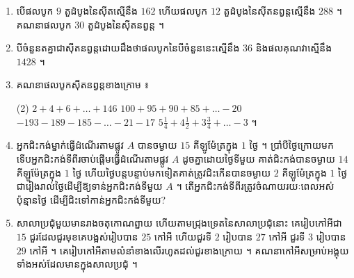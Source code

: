 \begin{enumerate}[1]
  \item បើផលបូក $9$ តួដំបូងនៃស៊ីតស្មើនឹង $162$ ហើយផលបូក $12$ តួដំបូងនៃស៊ីតនព្វន្តស្មើនឹង $288$ ។ គណនាផលបូក $30$ តួដំបូងនៃស៊ីតនព្វន្ត ។
  \item បីចំនួនតគ្នាជាស៊ីតនព្វន្តដោយដឹងថាផលបូកនៃបីចំនួននេះស្មើនឹង $36$ និងផលគុណវាស្មើនឹង $1428$ ។
  \item គណនាផលបូកស៊ីតនព្វន្តខាងក្រោម ៖
  \begin{tasks}(2)
    \task $2 + 4 + 6 + \ldots + 146$
    \task $100 + 95 + 90 + 85 + \ldots - 20$
    \task $-193 - 189 - 185 - \ldots - 21 - 17$
    \task $5\frac{1}{4} + 4\frac{1}{2} + 3\frac{3}{4} + \ldots - 3$ ។
  \end{tasks}
  \item អ្នកជិះកង់ម្នាក់ធ្វើដំណើរតាមផ្លូវ $A$ បានចម្ងាយ $15$ គីឡូម៉ែត្រក្នុង $1$ ថ្ងៃ ។ ប្រាំបីថ្ងៃក្រោយមក ទើបអ្នកជិះកង់ទីពីរចាប់ផ្តើមធ្វើដំណើរតាមផ្លូវ $A$ ដូចគ្នាដោយថ្ងៃទីមួយ គាត់ជិះកង់បានចម្ងាយ $14$ គីឡូម៉ែត្រក្នុង $1$ ថ្ងៃ ហើយថ្ងៃបន្តបន្ទាប់មកទៀតគាត់ត្រូវជិះកើនបានចម្ងាយ $2$ គីឡូម៉ែត្រក្នុង $1$ ថ្ងៃជារៀងរាល់ថ្ងៃដើម្បីឱ្យទាន់អ្នកជិះកង់ទីមួយ $A$ ។ តើអ្នកជិះកង់ទីពីរត្រូវចំណាយរយៈពេលអស់ប៉ុន្មានថ្ងៃ ដើម្បីជិះទៅកាន់អ្នកជិះកង់ទីមួយ?
  \item សាលាប្រជុំមួយមានរាងចតុកោណព្នាយ ហើយតាមជ្រុងទ្រេតនៃសាលាប្រជុំនោះ គេរៀបកៅអីជា $15$ ជួរដែលជួរមុខគេបង្អស់រៀបបាន $25$ កៅអី ហើយជួរទី $2$ រៀបបាន $27$ កៅអី ជួរទី $3$ រៀបបាន $29$ កៅអី ។ គេរៀបកៅអីតាមលំនាំខាងលើរហូតដល់ជួរខាងក្រោយ ។ គណនាកៅអីសម្រាប់អង្គុយទាំងអស់ដែលមានក្នុងសាលប្រជុំ ។
\end{enumerate}
